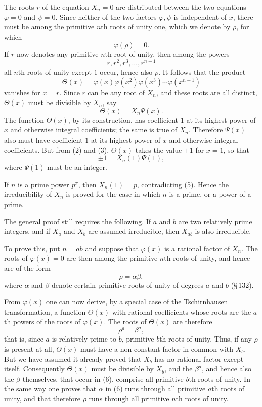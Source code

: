 \documentclass[11pt]{article}
\begin{document}
The roots $r$ of the equation $X_n=0$ are distributed between the two equations $\varphi=0$ and $\psi=0$. Since neither of the two factors $\varphi,\psi$ is independent of $x$, there must be among the primitive $n$th roots of unity one, which we denote by $\rho$, for which
\[
        \varphi(\rho)=0.
\]
If $r$ now denotes any primitive $n$th root of unity, then among the powers
\[
        r,r^2,r^3,\ldots,r^{n-1}
\]
all $n$th roots of unity except $1$ occur, hence also $\rho$. It follows that the product
\[
\tag{3}        \Theta(x)=\varphi(x)\varphi(x^2)\varphi(x^3)\cdots\varphi(x^{n-1})
\]
vanishes for $x=r$. Since $r$ can be any root of $X_n$, and these roots are all distinct, $\Theta(x)$ must be divisible by $X_n$, say
\[
\tag{4}        \Theta(x)=X_n\Psi(x).
\]
The function $\Theta(x)$, by its construction, has coefficient $1$ at its highest power of $x$ and otherwise integral coefficients; the same is true of $X_n$. Therefore $\Psi(x)$ also must have coefficient $1$ at its highest power of $x$ and otherwise integral coefficients. But from (2) and (3), $\Theta(x)$ takes the value $\pm1$ for $x=1$, so that
\[
\tag{5}        \pm1=X_n(1)\Psi(1),
\]
where $\Psi(1)$ must be an integer.

If $n$ is a prime power $p^\pi$, then $X_n(1)=p$, contradicting (5). Hence the irreducibility of $X_n$ is proved for the case in which $n$ is a prime, or a power of a prime.

The general proof still requires the following. If $a$ and $b$ are two relatively prime integers, and if $X_a$ and $X_b$ are assumed irreducible, then $X_{ab}$ is also irreducible.

To prove this, put $n=ab$ and suppose that $\varphi(x)$ is a rational factor of $X_n$. The roots of $\varphi(x)=0$ are then among the primitive $n$th roots of unity, and hence are of the form
\[
\tag{6}        \rho=\alpha\beta,
\]
where $\alpha$ and $\beta$ denote certain primitive roots of unity of degrees $a$ and $b$ (\S\,132).

From $\varphi(x)$ one can now derive, by a special case of the Tschirnhausen transformation, a function $\Theta(x)$ with rational coefficients whose roots are the $a$th powers of the roots of $\varphi(x)$. The roots of $\Theta(x)$ are therefore
\[
        \rho^a=\beta^a,
\]
that is, since $a$ is relatively prime to $b$, primitive $b$th roots of unity. Thus, if any $\rho$ is present at all, $\Theta(x)$ must have a non-constant factor in common with $X_b$. But we have assumed it already proved that $X_b$ has no rational factor except itself. Consequently $\Theta(x)$ must be divisible by $X_b$, and the $\beta^a$, and hence also the $\beta$ themselves, that occur in (6), comprise all primitive $b$th roots of unity. In the same way one proves that $\alpha$ in (6) runs through all primitive $a$th roots of unity, and that therefore $\rho$ runs through all primitive $n$th roots of unity.
\end{document}
